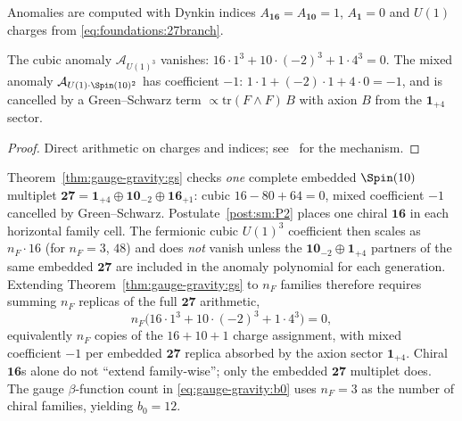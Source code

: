 Anomalies are computed with Dynkin indices $A_{\mathbf{16}}=A_{\mathbf{10}}=1$,
$A_{\mathbf{1}}=0$ and $U(1)$ charges from \eqref{eq:foundations:27branch}.

\begin{theorem}\label{thm:gauge-gravity:gs}
The cubic anomaly $\mathcal{A}_{U(1)^3}$ vanishes:
$16\cdot1^3+10\cdot(-2)^3+1\cdot4^3=0$.
The mixed anomaly $\mathcal{A}_{U(1)\cdot\Spin(10)^2}$ has coefficient $-1$:
$1\cdot1+(-2)\cdot1+4\cdot0=-1$,
and is cancelled by a Green--Schwarz term $\propto\mathrm{tr}(F\wedge F)\,B$
with axion $B$ from the $\mathbf{1}_{+4}$ sector.
\end{theorem}

\begin{proof}
Direct arithmetic on charges and indices; see~\cite{GreenSchwarz1984} for the
mechanism.
\end{proof}

\begin{proposition}
\label{prop:gauge-gravity:anomaly-nF}
Theorem~\ref{thm:gauge-gravity:gs} checks \emph{one} complete embedded
$\Spin(10)$ multiplet
$\mathbf{27}=\mathbf{1}_{+4}\oplus\mathbf{10}_{-2}\oplus\mathbf{16}_{+1}$:
cubic $16-80+64=0$, mixed coefficient $-1$ cancelled by Green--Schwarz.
Postulate~\ref{post:sm:P2} places one chiral $\mathbf{16}$ in each horizontal
family cell. The fermionic cubic $U(1)^3$ coefficient then scales as
$n_F\cdot 16$ (for $n_F=3$, $48$) and does \emph{not} vanish unless the
$\mathbf{10}_{-2}\oplus\mathbf{1}_{+4}$ partners of the same embedded
$\mathbf{27}$ are included in the anomaly polynomial for each generation.
Extending Theorem~\ref{thm:gauge-gravity:gs} to $n_F$ families therefore
requires summing $n_F$ replicas of the full $\mathbf{27}$ arithmetic,
\[
  n_F\bigl(16\cdot1^3+10\cdot(-2)^3+1\cdot4^3\bigr)=0,
\]
equivalently $n_F$ copies of the $16+10+1$ charge assignment, with mixed
coefficient $-1$ per embedded $\mathbf{27}$ replica absorbed by the axion
sector $\mathbf{1}_{+4}$. Chiral $\mathbf{16}$s alone do not
``extend family-wise''; only the embedded $\mathbf{27}$ multiplet does.
The gauge $\beta$-function count in \eqref{eq:gauge-gravity:b0} uses
$n_F=3$ as the number of chiral families, yielding $b_0=12$.
\end{proposition}

